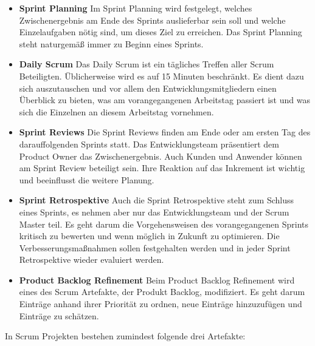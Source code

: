 \begin{itemize}
\item \textbf{Sprint Planning} Im Sprint Planning wird festgelegt, welches Zwischenergebnis am Ende des Sprints auslieferbar sein soll und welche Einzelaufgaben nötig sind, um dieses Ziel zu erreichen. Das Sprint Planning steht naturgemäß immer zu Beginn eines Sprints.
\item \textbf{Daily Scrum} Das Daily Scrum ist ein tägliches Treffen aller Scrum Beteiligten. Üblicherweise wird es auf 15 Minuten beschränkt. Es dient dazu sich auszutauschen und vor allem den Entwicklungsmitgliedern einen Überblick zu bieten, was am vorangegangenen Arbeitstag passiert ist und was sich die Einzelnen an diesem Arbeitstag vornehmen.
\item \textbf{Sprint Reviews} Die Sprint Reviews finden am Ende oder am ersten Tag des darauffolgenden Sprints statt. Das Entwicklungsteam präsentiert dem Product Owner das Zwischenergebnis. Auch Kunden und Anwender können am Sprint Review beteiligt sein. Ihre Reaktion auf das Inkrement ist wichtig und beeinflusst die weitere Planung.
\item \textbf{Sprint Retrospektive} Auch die Sprint Retrospektive steht zum Schluss eines Sprints, es nehmen aber nur das Entwicklungsteam und der Scrum Master teil. Es geht darum die Vorgehensweisen des vorangegangenen Sprints kritisch zu bewerten und wenn möglich in Zukunft zu optimieren. Die Verbesserungsmaßnahmen sollen festgehalten werden und in jeder Sprint Retrospektive wieder evaluiert werden.
\item \textbf{Product Backlog Refinement} Beim Product Backlog Refinement wird eines des Scrum Artefakte, der Produkt Backlog, modifiziert. Es geht darum Einträge anhand ihrer Priorität zu ordnen, neue Einträge hinzuzufügen und Einträge zu schätzen.
\end{itemize}

In Scrum Projekten bestehen zumindest folgende drei Artefakte:

